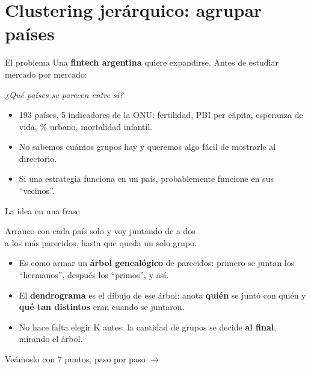 \documentclass{beamer}
\begin{document}
\section{Clustering jerárquico: agrupar países}

\begin{frame}{El problema}
    Una \textbf{fintech argentina} quiere expandirse. Antes de estudiar mercado por mercado:
    \begin{center}
        \Large \textit{¿Qué países se parecen entre sí?}
    \end{center}
    \begin{itemize}[<+->]
        \item 193 países, 5 indicadores de la ONU: fertilidad, PBI per cápita, esperanza de vida, \% urbano, mortalidad infantil.
        \item \alert{No sabemos cuántos grupos hay} y queremos algo fácil de mostrarle al directorio.
        \item Si una estrategia funciona en un país, probablemente funcione en sus ``vecinos''.
    \end{itemize}
\end{frame}

\begin{frame}{La idea en una frase}
    \begin{center}
        \Large Arranco con cada país solo y \alert{voy juntando de a dos} \\ a los más parecidos, hasta que queda un solo grupo.
    \end{center}
    \vspace{1em}
    \begin{itemize}[<+->]
        \item Es como armar un \textbf{árbol genealógico} de parecidos: primero se juntan los ``hermanos'', después los ``primos'', y así.
        \item El \textbf{dendrograma} es el dibujo de ese árbol: anota \textbf{quién} se juntó con quién y \textbf{qué tan distintos} eran cuando se juntaron.
        \item No hace falta elegir K antes: la cantidad de grupos se decide \textbf{al final}, mirando el árbol.
    \end{itemize}
    \vspace{0.5em}
    Veámoslo con 7 puntos, paso por paso $\rightarrow$
\end{frame}
\end{document}
